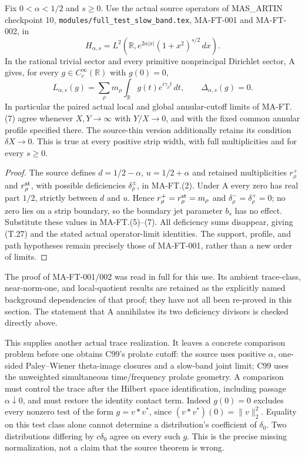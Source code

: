 \begin{theorem}
\label{AC-T12}
Fix \(0<\alpha<1/2\) and \(s\geq0\). Use the
actual source operators of MAS\_ARTIN checkpoint 10,
\texttt{modules/full\_test\_slow\_band.tex},
MA-FT-001 and MA-FT-002, in
\[
 H_{\alpha,s}
 =L^2\!\left(\mathbb R,
         e^{2\alpha|x|}(1+x^2)^{s/2}\,dx\right).
\]
In the rational trivial sector and every primitive
nonprincipal Dirichlet sector, A gives, for every
\(g\in C_c^\infty(\mathbb R)\) with \(g(0)=0\),
\[
 L_{\alpha,s}(g)=\sum_\rho m_\rho
        \int_{\mathbb R}g(t)e^{i\gamma_\rho t}\,dt,
 \qquad \Delta_{\alpha,s}(g)=0.                               \tag{T.27}
\]
In particular the paired actual local and global
annular-cutoff limits of MA-FT.(7) agree whenever
\(X,Y\to\infty\) with \(Y/X\to0\), and with the
fixed common annular profile specified there.
The source-thin version additionally retains
its condition \(\delta X\to0\).
This is true at every positive strip width,
with full multiplicities and for every \(s\geq0\).
\end{theorem}

\begin{proof}
The source defines \(d=1/2-\alpha\), \(u=1/2+\alpha\)
and retained multiplicities \(r_\rho^+\) and
\(r_\rho^{\rm st}\), with possible deficiencies
\(\delta_\rho^\pm\), in MA-FT.(2).
Under A every zero has real part \(1/2\), strictly
between \(d\) and \(u\). Hence
\(r_\rho^+=r_\rho^{\rm st}=m_\rho\) and
\(\delta_\rho^-=\delta_\rho^+=0\); no zero lies
on a strip boundary, so the boundary jet
parameter \(b_s\) has no effect.
Substitute these values in MA-FT.(5)--(7).
All deficiency sums disappear, giving (T.27)
and the stated actual operator-limit
identities. The support, profile, and
path hypotheses remain precisely those
of MA-FT-001, rather than a new order
of limits.
\end{proof}

The proof of MA-FT-001/002 was read in full
for this use. Its ambient trace-class,
near-norm-one, and local-quotient results
are retained as the explicitly named
background dependencies of that proof;
they have not all been re-proved in
this section. The statement that A
annihilates its two deficiency divisors
is checked directly above.

This supplies another actual trace realization.
It leaves a concrete comparison problem before
one obtains C99's prolate cutoff: the source
uses positive \(\alpha\), one-sided
Paley--Wiener theta-image closures and
a slow-band joint limit; C99 uses the
unweighted simultaneous time/frequency
prolate geometry. A comparison must
control the trace after the Hilbert
space identification, including passage
\(\alpha\downarrow0\), and must restore
the identity contact term. Indeed
\(g(0)=0\) excludes every nonzero test
of the form \(g=v*v^*\), since
\((v*v^*)(0)=\|v\|_2^2\).
Equality on this test class alone cannot
determine a distribution's coefficient
of \(\delta_0\). Two distributions
differing by \(c\delta_0\) agree on
every such \(g\). This is the precise
missing normalization, not a claim
that the source theorem is wrong.

